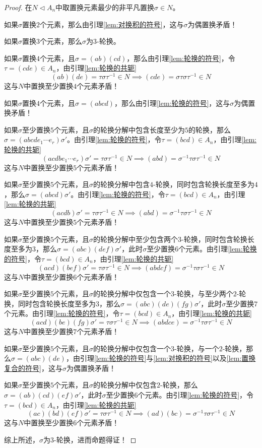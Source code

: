 \begin{proof}
	在$N\lhd A_n$中取置换元素最少的非平凡置换$\sigma\in N$。
	
	如果$\sigma$置换$2$个元素，那么由引理\ref{lem:对换积的符号}，这与$\sigma$为偶置换矛盾！
	
	如果$\sigma$置换$3$个元素，那么$\sigma$为$3$-轮换。
	
	如果$\sigma$置换$4$个元素，且$\sigma=(ab)(cd)$，那么由引理\ref{lem:轮换的符号}，令$\tau=(cde)\in A_n$，由引理\ref{lem:轮换的共轭}
	$$
	(ab)(de)=\tau\sigma\tau^{-1}\in N\implies(cde)=\sigma\tau\sigma\tau^{-1}\in N
	$$
	这与$N$中置换至少置换$4$个元素矛盾！
	
	如果$\sigma$置换$4$个元素，且$\sigma=(abcd)$，那么由引理\ref{lem:轮换的符号}，这与$\sigma$为偶置换矛盾！
	
	如果$\sigma$至少置换$5$个元素，且$\sigma$的轮换分解中包含长度至少为$5$的轮换，那么$\sigma=(abcde_1\cdots e_r)\sigma'$。由引理\ref{lem:轮换的符号}，令$\tau=(bcd)\in A_n$，由引理\ref{lem:轮换的共轭}
	$$
	(acdbe_1\cdots e_r)\sigma'=\tau\sigma\tau^{-1}\in N\implies (abd)=\sigma^{-1}\tau\sigma\tau^{-1}\in N
	$$
	这与$N$中置换至少置换$5$个元素矛盾！
	
	如果$\sigma$至少置换$5$个元素，且$\sigma$的轮换分解中包含$4$-轮换，同时包含轮换长度至多为$4$，那么$\sigma=(abcd)\sigma'$。由引理\ref{lem:轮换的符号}，令$\tau=(bcd)\in A_n$，由引理\ref{lem:轮换的共轭}
	$$
	(acdb)\sigma'=\tau\sigma\tau^{-1}\in N\implies (abd)=\sigma^{-1}\tau\sigma\tau^{-1}\in N
	$$
	这与$N$中置换至少置换$5$个元素矛盾！
	
	如果$\sigma$至少置换$5$个元素，且$\sigma$的轮换分解中至少包含两个$3$-轮换，同时包含轮换长度至多为$3$，那么$\sigma=(abc)(def)\sigma'$，此时$\sigma$至少置换$6$个元素。由引理\ref{lem:轮换的符号}，令$\tau=(bcd)\in A_n$，由引理\ref{lem:轮换的共轭}
	$$
	(acd)(bef)\sigma'=\tau\sigma\tau^{-1}\in N\implies (abdcf)=\sigma^{-1}\tau\sigma\tau^{-1}\in N
	$$
	这与$N$中置换至少置换$6$个元素矛盾！
	
	如果$\sigma$至少置换$5$个元素，且$\sigma$的轮换分解中仅包含一个$3$-轮换，与至少两个$2$-轮换，同时包含轮换长度至多为$3$，那么$\sigma=(abc)(de)(fg)\sigma'$，此时$\sigma$至少置换$7$个元素。由引理\ref{lem:轮换的符号}，令$\tau=(bcd)\in A_n$，由引理\ref{lem:轮换的共轭}
	$$
	(acd)(be)(fg)\sigma'=\tau\sigma\tau^{-1}\in N\implies (abdce)=\sigma^{-1}\tau\sigma\tau^{-1}\in N
	$$
	这与$N$中置换至少置换$7$个元素矛盾！
	
	如果$\sigma$至少置换$5$个元素，且$\sigma$的轮换分解中仅包含一个$3$-轮换，与一个$2$-轮换，那么$\sigma=(abc)(de)$，由引理\ref{lem:轮换的符号}与\ref{lem:对换积的符号}以及\ref{lem:置换复合的符号}，这与$\sigma$为偶置换矛盾！
	
	如果$\sigma$至少置换$5$个元素，且$\sigma$的轮换分解中仅包含$2$-轮换，那么$\sigma=(ab)(cd)(ef)\sigma'$，此时$\sigma$至少置换$6$个元素。由引理\ref{lem:轮换的符号}，令$\tau=(bcd)\in A_n$，由引理\ref{lem:轮换的共轭}
	$$
	(ac)(bd)(ef)\sigma'=\tau\sigma\tau^{-1}\in N\implies (ad)(bc)=\sigma^{-1}\tau\sigma\tau^{-1}\in N
	$$
	这与$N$中置换至少置换$6$个元素矛盾！
	
	综上所述，$\sigma$为$3$-轮换，进而命题得证！
\end{proof}

